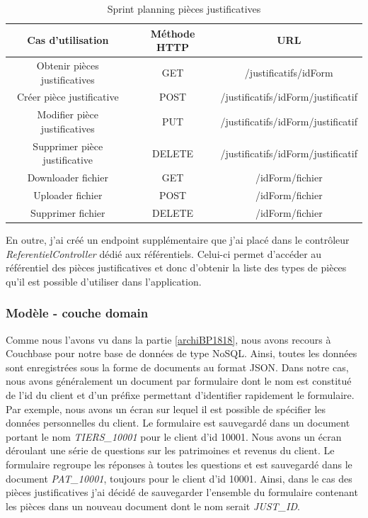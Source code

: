 \begin{table}[h!]
	\center
	\begin{tabular}{| c | c | c |}
     \hline
     Cas d'utilisation & Méthode HTTP & URL \\ \hline
     Obtenir pièces justificatives & GET & /justificatifs/{idForm}\\ \hline
     Créer pièce justificative & POST & /justificatifs/{idForm}/justificatif\\ \hline
     Modifier pièce justificatives & PUT & /justificatifs/{idForm}/justificatif\\ \hline
     Supprimer pièce justificative & DELETE & /justificatifs/{idForm}/justificatif\\ \hline
     Downloader fichier & GET & /{idForm}/fichier\\ \hline
     Uploader fichier & POST & /{idForm}/fichier\\ \hline
     Supprimer fichier & DELETE & /{idForm}/fichier\\ \hline
	\end{tabular}
	\caption{Sprint planning pièces justificatives}
	\label{sprintPlanningPJ}
\end{table}

	En outre, j'ai créé un endpoint supplémentaire que j'ai placé dans le contrôleur \textit{ReferentielController} dédié aux référentiels. Celui-ci permet d'accéder au référentiel des pièces justificatives et donc d'obtenir la liste des types de pièces qu'il est possible d'utiliser dans l'application.

	\subsubsection{Modèle - couche domain}
	
	Comme nous l'avons vu dans la partie \ref{archiBP1818}, nous avons recours à Couchbase pour notre base de données de type NoSQL. Ainsi, toutes les données sont enregistrées sous la forme de documents au format JSON. Dans notre cas, nous avons généralement un document par formulaire dont le nom est constitué de l'id du client et d'un préfixe permettant d'identifier rapidement le formulaire. Par exemple, nous avons un écran sur lequel il est possible de spécifier les données personnelles du client. Le formulaire est sauvegardé dans un document portant le nom \textit{TIERS\_10001} pour le client d'id 10001. Nous avons un écran déroulant une série de questions sur les patrimoines et revenus du client. Le formulaire regroupe les réponses à toutes les questions et est sauvegardé dans le document \textit{PAT\_10001}, toujours pour le client d'id 10001. Ainsi, dans le cas des pièces justificatives j'ai décidé de sauvegarder l'ensemble du formulaire contenant les pièces dans un nouveau document dont le nom serait \textit{JUST\_ID}. \\
	
